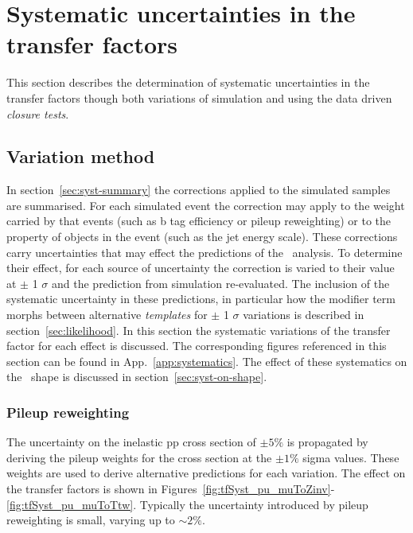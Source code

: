 \section{Systematic uncertainties in the transfer factors}
\label{sec:syst-uncs}
This section describes the determination of systematic uncertainties 
in the transfer factors though both variations of simulation
and using the data driven \emph{closure tests}. 

\subsection{Variation method}
\label{sec:syst-uncs-var}
In section~\ref{sec:syst-summary} the corrections applied to the simulated samples are summarised. For each 
simulated event the correction may apply to the weight carried by that events (such as b tag efficiency
or pileup reweighting) or to the property of objects in the event (such as the jet energy scale). 
These corrections carry uncertainties that may effect the predictions of the \alphat~analysis.
To determine their effect, for each source of uncertainty the correction is varied to their
value at $\pm$ 1 $\sigma$ and the prediction from simulation re-evaluated. The inclusion of the systematic uncertainty 
in these predictions, in particular how the modifier term morphs between alternative \emph{templates} 
for $\pm$ 1 $\sigma$ variations is described in section~\ref{sec:likelihood}. In this section the systematic variations
of the transfer factor for each effect is discussed. The corresponding figures referenced in
this section can be found in App.~\ref{app:systematics}. The effect of these systematics on 
the \mht~shape is discussed in section~\ref{sec:syst-on-shape}.

\subsubsection{Pileup reweighting}

The uncertainty on the inelastic pp cross section of $\pm5\%$ is propagated by deriving the pileup
weights for the cross section at the $\pm1\%$ sigma values. These weights are used to derive
alternative predictions for each variation. The effect on the transfer factors is shown in 
Figures~\ref{fig:tfSyst_pu_muToZinv}-\ref{fig:tfSyst_pu_muToTtw}. Typically the uncertainty 
introduced by pileup reweighting is small, varying up to $\sim2\%$.

